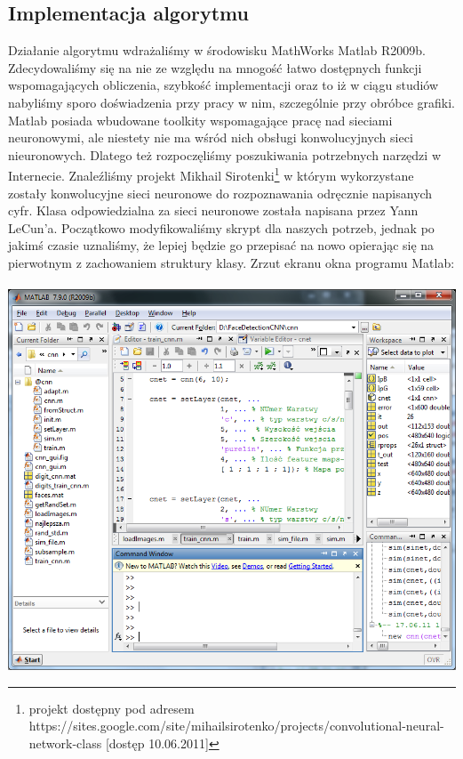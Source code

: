 \documentclass[11pt,a4paper]{article}
\begin{document}
\subsection{Implementacja algorytmu}
Działanie algorytmu wdrażaliśmy w środowisku MathWorks Matlab R2009b. Zdecydowaliśmy się na nie ze względu na mnogość łatwo dostępnych funkcji wspomagających obliczenia, szybkość implementacji oraz to iż w ciągu studiów nabyliśmy sporo doświadzenia przy pracy w nim, szczególnie przy obróbce grafiki.\\
\indent
Matlab posiada wbudowane toolkity wspomagające pracę nad sieciami neuronowymi, ale niestety nie ma wśród nich obsługi konwolucyjnych sieci nieuronowych. Dlatego też rozpoczęliśmy poszukiwania potrzebnych narzędzi w Internecie. Znaleźliśmy projekt Mikhail Sirotenki\footnote{ projekt dostępny pod adresem  https://sites.google.com/site/mihailsirotenko/projects/convolutional-neural-network-class [dostęp 10.06.2011]}  w którym wykorzystane zostały konwolucyjne sieci neuronowe do rozpoznawania odręcznie napisanych cyfr. Klasa odpowiedzialna za sieci neuronowe została napisana przez Yann LeCun'a. Początkowo modyfikowaliśmy skrypt dla naszych potrzeb, jednak po jakimś czasie uznaliśmy, że lepiej będzie go przepisać na nowo opierając się na pierwotnym z zachowaniem struktury klasy. Zrzut ekranu okna programu Matlab:\\
\\
\vspace*{0.5cm}
\includegraphics[scale=0.5]{matlab}
\vspace*{0.5cm}
\end{document}
